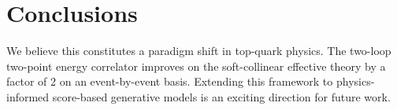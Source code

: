\section{Conclusions}\label{sec:conclusions}

We believe this constitutes a paradigm shift in top-quark physics. The
two-loop two-point energy correlator improves on the soft-collinear
effective theory by a factor of 2 on an event-by-event basis. Extending
this framework to physics-informed score-based generative models is an
exciting direction for future work.

